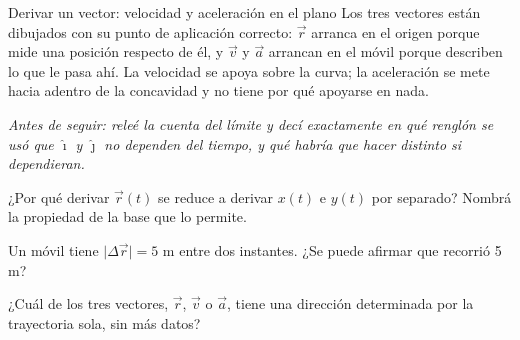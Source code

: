 \documentclass[11pt,openany]{book}
\begin{document}
\begin{bloque}{Derivar un vector: velocidad y aceleración en el plano}
Los tres vectores están dibujados con su punto de aplicación correcto: $\vec r$ arranca en el origen porque mide una posición respecto de él, y $\vec v$ y $\vec a$ arrancan en el móvil porque describen lo que le pasa ahí. La velocidad se apoya sobre la curva; la aceleración se mete hacia adentro de la concavidad y no tiene por qué apoyarse en nada.

\textit{Antes de seguir: releé la cuenta del límite y decí exactamente en qué renglón se usó que $\hat\imath$ y $\hat\jmath$ no dependen del tiempo, y qué habría que hacer distinto si dependieran.}
\end{bloque}

\begin{chequeo}
\item ¿Por qué derivar $\vec r(t)$ se reduce a derivar $x(t)$ e $y(t)$ por separado? Nombrá la propiedad de la base que lo permite.
\item Un móvil tiene $\lvert\Delta\vec r\rvert = 5$ m entre dos instantes. ¿Se puede afirmar que recorrió 5 m?
\item ¿Cuál de los tres vectores, $\vec r$, $\vec v$ o $\vec a$, tiene una dirección determinada por la trayectoria sola, sin más datos?
\end{chequeo}
\end{document}
